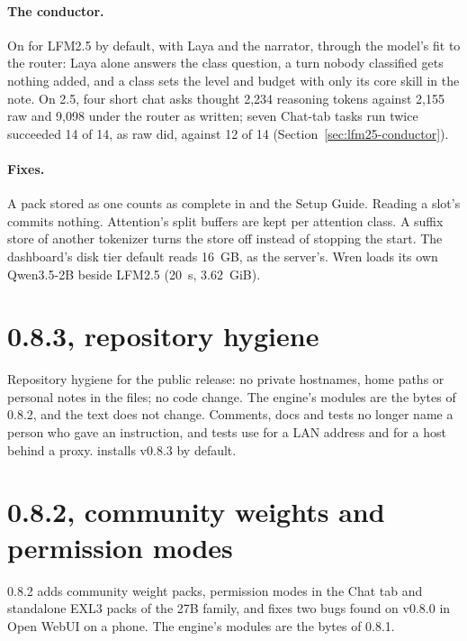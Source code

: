 \paragraph{The conductor.} On for LFM2.5 by default, with Laya and the narrator, through the model's fit to the router: Laya alone answers the class question, a turn nobody classified gets nothing added, and a class sets the level and budget with only its core skill in the note. On 2.5, four short chat asks thought 2,234 reasoning tokens against 2,155 raw and 9,098 under the router as written; seven Chat-tab tasks run twice succeeded 14 of 14, as raw did, against 12 of 14 (Section~\ref{sec:lfm25-conductor}).

\paragraph{Fixes.} A pack stored as one  counts as complete in  and the Setup Guide. Reading a slot's  commits nothing. Attention's split buffers are kept per attention class. A suffix store of another tokenizer turns the store off instead of stopping the start. The dashboard's disk tier default reads 16~GB, as the server's. Wren loads its own Qwen3.5-2B beside LFM2.5 (20~s, 3.62~GiB).

\section{0.8.3, repository hygiene}\label{sec:changelog-083}

Repository hygiene for the public release: no private hostnames, home paths or personal notes in the files; no code change. The engine's modules are the bytes of 0.8.2, and the text does not change. Comments, docs and tests no longer name a person who gave an instruction, and tests use  for a LAN address and  for a host behind a proxy.  installs v0.8.3 by default.

\section{0.8.2, community weights and permission modes}\label{sec:changelog-082}

0.8.2 adds community weight packs, permission modes in the Chat tab and standalone EXL3 packs of the 27B family, and fixes two bugs found on v0.8.0 in Open WebUI on a phone. The engine's modules are the bytes of 0.8.1.

